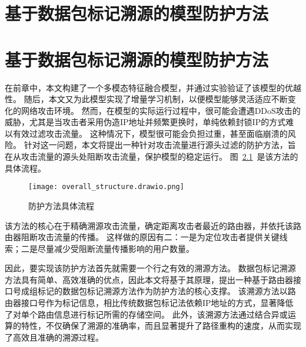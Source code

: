\chapter{基于数据包标记溯源的模型防护方法}
\chapter{基于数据包标记溯源的模型防护方法}
\label{cha:IGPPM}

在前章中，本文构建了一个多模态特征融合模型，并通过实验验证了该模型的优越性。
随后，本文又为此模型实现了增量学习机制，以便模型能够灵活适应不断变化的网络攻击环境。
然而，在模型的实际运行过程中，很可能会遭遇DDoS攻击的威胁，尤其是当攻击者采用伪造IP地址并频繁更换时，单纯依赖封锁IP的方式难以有效过滤攻击流量。
这种情况下，模型很可能会负担过重，甚至面临崩溃的风险。
针对这一问题，本文将提出一种针对攻击流量进行源头过滤的防护方法，旨在从攻击流量的源头处阻断攻击流量，保护模型的稳定运行。
图~\ref{fig:overall_structure}~是该方法的具体流程。
\begin{figure}[h]
	\centering
	\texttt{[image: overall\_structure.drawio.png]}
	\caption{防护方法具体流程}
	\label{fig:overall_structure}
\end{figure}
该方法的核心在于精确溯源攻击流量，确定距离攻击者最近的路由器，并依托该路由器阻断攻击流量的传播。
这样做的原因有二：一是为定位攻击者提供关键线索；二是尽量减少受阻断流量传播影响的用户数量。\par

因此，要实现该防护方法首先就需要一个行之有效的溯源方法。
数据包标记溯源方法具有简单、高效准确的优点，因此本文将基于其原理，提出一种基于路由器接口号成组标记的数据包标记溯源方法作为防护方法的核心支撑。
该溯源方法以路由器接口号作为标记信息，相比传统数据包标记法依赖IP地址的方式，显著降低了对单个路由信息进行标记所需的存储空间。
此外，该溯源方法通过结合异或运算的特性，不仅确保了溯源的准确率，而且显著提升了路径重构的速度，从而实现了高效且准确的溯源过程。

